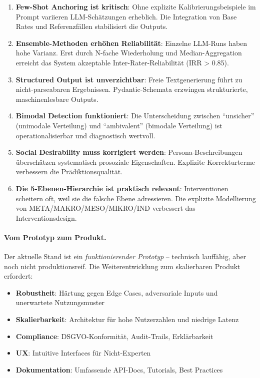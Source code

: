 \begin{enumerate}
    \item \textbf{Few-Shot Anchoring ist kritisch}: Ohne explizite Kalibrierungsbeispiele im Prompt variieren LLM-Schätzungen erheblich. Die Integration von Base Rates und Referenzfällen stabilisiert die Outputs.

    \item \textbf{Ensemble-Methoden erhöhen Reliabilität}: Einzelne LLM-Runs haben hohe Varianz. Erst durch N-fache Wiederholung und Median-Aggregation erreicht das System akzeptable Inter-Rater-Reliabilität (IRR > 0.85).

    \item \textbf{Structured Output ist unverzichtbar}: Freie Textgenerierung führt zu nicht-parseabaren Ergebnissen. Pydantic-Schemata erzwingen strukturierte, maschinenlesbare Outputs.

    \item \textbf{Bimodal Detection funktioniert}: Die Unterscheidung zwischen ``unsicher'' (unimodale Verteilung) und ``ambivalent'' (bimodale Verteilung) ist operationalisierbar und diagnostisch wertvoll.

    \item \textbf{Social Desirability muss korrigiert werden}: Persona-Beschreibungen überschätzen systematisch prosoziale Eigenschaften. Explizite Korrekturterme verbessern die Prädiktionsqualität.

    \item \textbf{Die 5-Ebenen-Hierarchie ist praktisch relevant}: Interventionen scheitern oft, weil sie die falsche Ebene adressieren. Die explizite Modellierung von META/MAKRO/MESO/MIKRO/IND verbessert das Interventionsdesign.
\end{enumerate}

\paragraph{Vom Prototyp zum Produkt.}

Der aktuelle Stand ist ein \textit{funktionierender Prototyp} -- technisch lauffähig, aber noch nicht produktionsreif. Die Weiterentwicklung zum skalierbaren Produkt erfordert:

\begin{itemize}
    \item \textbf{Robustheit}: Härtung gegen Edge Cases, adversariale Inputs und unerwartete Nutzungsmuster
    \item \textbf{Skalierbarkeit}: Architektur für hohe Nutzerzahlen und niedrige Latenz
    \item \textbf{Compliance}: DSGVO-Konformität, Audit-Trails, Erklärbarkeit
    \item \textbf{UX}: Intuitive Interfaces für Nicht-Experten
    \item \textbf{Dokumentation}: Umfassende API-Docs, Tutorials, Best Practices
\end{itemize}


